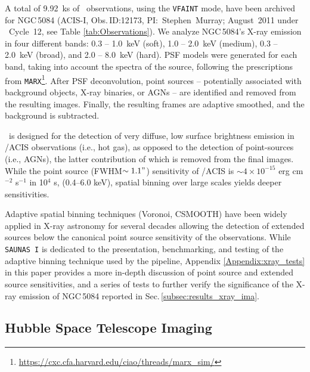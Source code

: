 \documentclass[modern]{CORE-AAS/aastex631}
\begin{document}
A total of 9.92~ks of \Chandra\ observations, using the \texttt{VFAINT} mode, have been archived for NGC\,5084 (ACIS-I, Obs.\,ID:12173, PI:~Stephen~Murray; August~2011 under \Chandra\ Cycle~12, see Table \ref{tab:Observations}). We analyze NGC\,5084's X-ray emission in four different bands: 0.3 -- 1.0~keV (soft), 1.0 -- 2.0~keV (medium), 0.3 -- 2.0~keV (broad), and 2.0 -- 8.0~keV (hard). PSF models were generated for each band, taking into account the spectra of the source, following the prescriptions from \texttt{MARX}\footnote{\url{https://cxc.cfa.harvard.edu/ciao/threads/marx_sim/}}. After PSF deconvolution, point sources -- potentially associated with background objects, X-ray binaries, or AGNs -- are identified and removed from the resulting images. Finally, the resulting frames are adaptive smoothed, and the background is subtracted. 

\SAUNAS\ is designed for the detection of very diffuse, low surface brightness emission in \Chandra/ACIS observations (i.e., hot gas), as opposed to the detection of point-sources (i.e., AGNs), the latter contribution of which is removed from the final images. While the point source (FWHM$\sim1.1"$) sensitivity of \Chandra/ACIS is $\sim4\times10^{-15}$ erg cm$^{-2}$ s$^{-1}$ in 10$^4$ s, (0.4--6.0 keV), spatial binning over large scales yields deeper sensitivities.

Adaptive spatial binning techniques (Voronoi, CSMOOTH) \citep{cappellari+2003mnras342_345, ebeling+2006mnras368_65} have been widely applied in X-ray astronomy for several decades \citep[see][and references therein]{ebeling+2007apj661_33,gonzalezmartin+2009aap506_1107,broos+2010apj714_1582, ebeling+2010mnras407_83, xue+2011apj195_10, hodgeskluck+2012apj746_167, wang+2024apj962_188} allowing the detection of extended sources below the canonical point source sensitivity of the observations. While \texttt{SAUNAS I} \citep{borlaff+2024apj967_169} is dedicated to the presentation, benchmarking, and testing of the adaptive binning technique used by the pipeline, Appendix \ref{Appendix:xray_tests} in this paper provides a more in-depth discussion of point source and extended source sensitivities, and a series of tests to further verify the significance of the X-ray emission of NGC\,5084 reported in Sec.\,\ref{subsec:results_xray_ima}.

\subsection{Hubble Space Telescope Imaging} \label{sec:data_hst}
\end{document}
